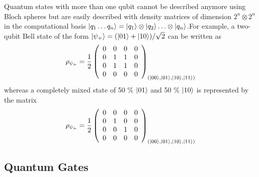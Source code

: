 \smallskip

Quantum states with more than one qubit cannot be described anymore using Bloch spheres but are easily described with density matrices of dimension $2^n\otimes 2^n$ in the computational basis $\left| q_1\hdots q_n \right>=\left| q_1 \right>\otimes\left| q_{2} \right>\hdots\otimes\left| q_n \right>$.For example, a two-qubit Bell state of the form $\left| \psi_+ \right>=(\left| 01 \right>+\left| 10 \right>)/\sqrt{2}$ can be written as
%
\begin{equation}
\rho_{\psi_+} = \frac{1}{2}\left( \begin{array}{cccc} 0 & 0 & 0 & 0 \\ 0 & 1 & 1 & 0 \\ 0 & 1 & 1 & 0 \\ 0 & 0 & 0 & 0 \end{array} \right)_{(\left| 00 \right>,\left| 01 \right>,\left| 10 \right>,\left| 11 \right>)}
\end{equation}
%
whereas a completely mixed state of 50 \% $\left| 01 \right>$ and 50 \% $\left| 10 \right>$ is represented by the matrix
%
\begin{equation}
\rho_{\psi_+} = \frac{1}{2}\left( \begin{array}{cccc} 0 & 0 & 0 & 0 \\ 0 & 1 & 0 & 0 \\ 0 & 0 & 1 & 0 \\ 0 & 0 & 0 & 0 \end{array} \right)_{(\left| 00 \right>,\left| 01 \right>,\left| 10 \right>,\left| 11 \right>)}
\end{equation}
%

\subsection{Quantum Gates}

